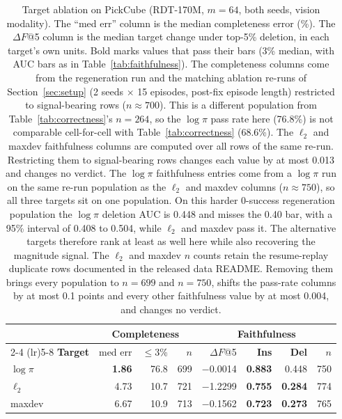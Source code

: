 \documentclass{article}
\begin{document}
\begin{table}[t!]
\centering
\footnotesize
\setlength{\tabcolsep}{4pt}
\begin{tabular}{@{}l rrr rrrr@{}}
\toprule
 & \multicolumn{3}{c}{\textbf{Completeness}} & \multicolumn{4}{c}{\textbf{Faithfulness}} \\
\cmidrule(lr){2-4} \cmidrule(lr){5-8}
\textbf{Target} & med err & $\leq$3\% & $n$ & $\Delta F$@5 & \textbf{Ins} & \textbf{Del} & $n$ \\
\midrule
$\log\pi$ & \textbf{1.86} & 76.8 & 699 & $-$0.0014 & \textbf{0.883} & 0.448 & 750 \\
\rowcolor{gray!6}
$\ell_2$ & 4.73 & 10.7 & 721 & $-$1.2299 & \textbf{0.755} & \textbf{0.284} & 774 \\
maxdev & 6.67 & 10.9 & 713 & $-$0.1562 & \textbf{0.723} & \textbf{0.273} & 765 \\
\bottomrule
\end{tabular}
\caption{Target ablation on PickCube (RDT-170M, $m{=}64$, both seeds, vision modality). The ``med err'' column is the median completeness error (\%). The $\Delta F$@5 column is the median target change under top-5\% deletion, in each target's own units. Bold marks values that pass their bars (3\% median, with AUC bars as in Table~\ref{tab:faithfulness}). The completeness columns come from the regeneration run and the matching ablation re-runs of Section~\ref{sec:setup} (2 seeds $\times$ 15 episodes, post-fix episode length) restricted to signal-bearing rows ($n{\approx}700$). This is a different population from Table~\ref{tab:correctness}'s $n{=}264$, so the $\log\pi$ pass rate here (76.8\%) is not comparable cell-for-cell with Table~\ref{tab:correctness} (68.6\%). The $\ell_2$ and maxdev faithfulness columns are computed over all rows of the same re-run. Restricting them to signal-bearing rows changes each value by at most 0.013 and changes no verdict. The $\log\pi$ faithfulness entries come from a $\log\pi$ run on the same re-run population as the $\ell_2$ and maxdev columns ($n{\approx}750$), so all three targets sit on one population. On this harder 0-success regeneration population the $\log\pi$ deletion AUC is 0.448 and misses the 0.40 bar, with a 95\% interval of 0.408 to 0.504, while $\ell_2$ and maxdev pass it. The alternative targets therefore rank at least as well here while also recovering the magnitude signal. The $\ell_2$ and maxdev $n$ counts retain the resume-replay duplicate rows documented in the released data README. Removing them brings every population to $n{=}699$ and $n{=}750$, shifts the pass-rate columns by at most 0.1 points and every other faithfulness value by at most 0.004, and changes no verdict.}
\label{tab:targets}
\end{table}
\end{document}
